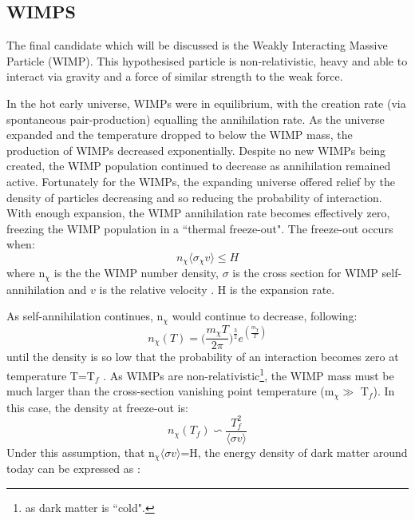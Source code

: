 \subsection{WIMPS}
\label{sec:wimp_as_a_candidate}
\par
The final candidate which will be discussed is the Weakly Interacting Massive Particle (WIMP).%
This hypothesised particle is non-relativistic, heavy and able to interact via gravity and a force of similar strength to the weak force.
\par
In the hot early universe, WIMPs were in equilibrium, with the creation rate (via spontaneous pair-production) equalling the annihilation rate.
As the universe expanded and the temperature dropped to below the WIMP mass, the production of WIMPs decreased exponentially.
Despite no new WIMPs being created, the WIMP population continued to decrease as annihilation remained active.
Fortunately for the WIMPs, the expanding universe offered relief by the density of particles decreasing and so reducing the probability of interaction.
With enough expansion, the WIMP annihilation rate becomes effectively zero, freezing the WIMP population in a ``thermal freeze-out".
The freeze-out occurs when:
\begin{equation}
    n_\chi \langle \sigma_{\chi} v \rangle \leq H
\end{equation}
where n$_\chi$ is the the WIMP number density, $\sigma$ is the cross section for WIMP self-annihilation and $v$ is the relative velocity \cite{wimp_theory_ref}.
H is the expansion rate.
\par
As self-annihilation continues, n$_\chi$ would continue to decrease, following:
\begin{equation}
    n_\chi(T) = \bigg(\frac{m_\chi T}{2\pi}\bigg)^{\frac{3}{2}} e^{(\frac{m_\chi}{T})}
\end{equation}
until the density is so low that the probability of an interaction becomes zero at temperature T=T$_f$ \cite{wimp_theory_ref}.
As WIMPs are non-relativistic\footnote{as dark matter is ``cold".}, the WIMP mass must be much larger than the cross-section vanishing point temperature (m$_\chi \gg$ T$_f$).
In this case, the density at freeze-out is:
\begin{equation}
    n_\chi(T_f) \backsim \frac{T^2_f}{\langle \sigma v \rangle}
\end{equation}
Under this assumption, that n$_\chi \langle \sigma v \rangle$=H, the energy density of dark matter around today can be expressed as \cite{less_of_a_wimp_miracle_ref}:
